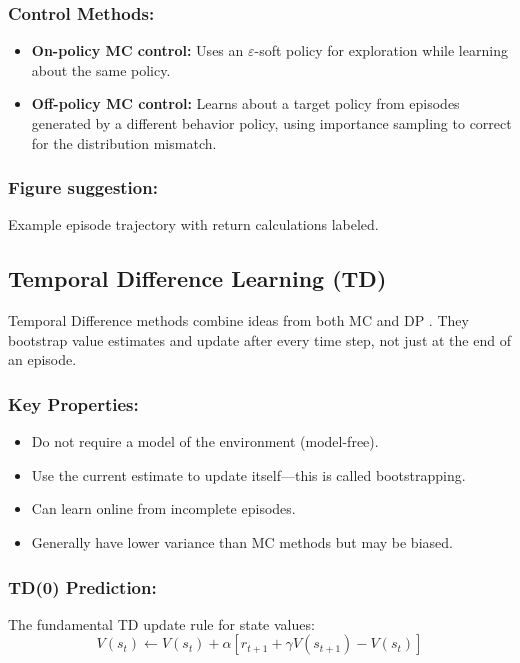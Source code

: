 \documentclass[../Main.tex]{subfiles}
\begin{document}
\subsubsection{Control Methods:}
\begin{itemize}
    \item \textbf{On-policy MC control:} Uses an $\varepsilon$-soft policy for exploration while learning about the same policy.
    \item \textbf{Off-policy MC control:} Learns about a target policy from episodes generated by a different behavior policy, using importance sampling to correct for the distribution mismatch.
\end{itemize}

\subsubsection{Figure suggestion:} Example episode trajectory with return calculations labeled.

\subsection{Temporal Difference Learning (TD)}

Temporal Difference methods combine ideas from both MC and DP \cite{sutton1988learning}. They bootstrap value estimates and update after every time step, not just at the end of an episode.

\subsubsection{Key Properties:}
\begin{itemize}
    \item Do not require a model of the environment (model-free).
    \item Use the current estimate to update itself—this is called bootstrapping.
    \item Can learn online from incomplete episodes.
    \item Generally have lower variance than MC methods but may be biased.
\end{itemize}

\subsubsection{TD(0) Prediction:}
The fundamental TD update rule for state values:
\[
V(s_t) \leftarrow V(s_t) + \alpha \left[ r_{t+1} + \gamma V(s_{t+1}) - V(s_t) \right]
\]
\end{document}
